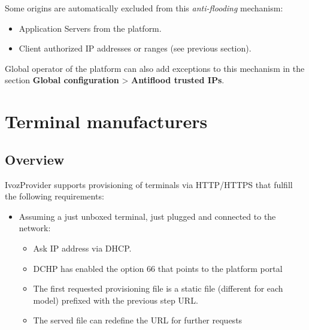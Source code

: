 \documentclass[letterpaper,10pt,english]{sphinxmanual}
\begin{document}
Some origins are automatically excluded from this \emph{anti-flooding} mechanism:
\begin{itemize}
\item {} 
Application Servers from the platform.

\item {} 
Client authorized IP addresses or ranges (see previous section).

\end{itemize}

Global operator of the platform can also add exceptions to this mechanism in
the section \textbf{Global configuration} \textgreater{} \textbf{Antiflood trusted IPs}.


\section{Terminal manufacturers}
\label{administration_portal/platform/terminal_manufacturers:terminal-manufacturers}\label{administration_portal/platform/terminal_manufacturers::doc}\label{administration_portal/platform/terminal_manufacturers:provisioning}

\subsection{Overview}
\label{administration_portal/platform/terminal_manufacturers:overview}
IvozProvider supports provisioning of terminals via HTTP/HTTPS that fulfill the
following requirements:
\begin{itemize}
\item {} 
Assuming a just unboxed terminal, just plugged and connected to the network:
\begin{itemize}
\item {} 
Ask IP address via DHCP.

\item {} 
DCHP has enabled the option 66 that points to the platform portal

\item {} 
The first requested provisioning file is a static file (different for each
model) prefixed with the previous step URL.

\item {} 
The served file can redefine the URL for further requests

\end{itemize}

\end{itemize}
\end{document}
